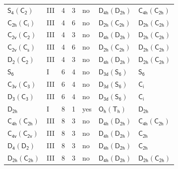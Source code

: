 \documentclass[10pt,a4paper]{article}
\numberwithin{equation}{section}
\newcommand{\grp}[1]{\mathsf{#1}}
\begin{document}
{\begin{longtable}{@{}llrrlll@{}}
\href{S4-C2.pdf}{$\grp{S_{4}}(\grp{C_{2}})$} & III & 4 & 3 & no & \href{D4h-D2h.pdf}{$\grp{D_{4h}}(\grp{D_{2h}})$} & \href{C4h-C2h.pdf}{$\grp{C_{4h}}(\grp{C_{2h}})$}\\
\href{C2h-S2.pdf}{$\grp{C_{2h}}(\grp{C_{i}})$} & III & 4 & 6 & no & \href{D2h-C2h.pdf}{$\grp{D_{2h}}(\grp{C_{2h}})$} & \href{D2h-C2h.pdf}{$\grp{D_{2h}}(\grp{C_{2h}})$}\\
\href{C2v-C2.pdf}{$\grp{C_{2v}}(\grp{C_{2}})$} & III & 4 & 3 & no & \href{D4h-D2h.pdf}{$\grp{D_{4h}}(\grp{D_{2h}})$} & \href{D2h-C2h.pdf}{$\grp{D_{2h}}(\grp{C_{2h}})$}\\
\href{C2v-C1v.pdf}{$\grp{C_{2v}}(\grp{C_{s}})$} & III & 4 & 6 & no & \href{D2h-C2h.pdf}{$\grp{D_{2h}}(\grp{C_{2h}})$} & \href{D2h-C2h.pdf}{$\grp{D_{2h}}(\grp{C_{2h}})$}\\
\href{D2-C2.pdf}{$\grp{D_{2}}(\grp{C_{2}})$} & III & 4 & 3 & no & \href{D4h-D2h.pdf}{$\grp{D_{4h}}(\grp{D_{2h}})$} & \href{D2h-C2h.pdf}{$\grp{D_{2h}}(\grp{C_{2h}})$}\\
\href{../../../rotation/data/pdf/S6.pdf}{$\grp{S_{6}}$} & I & 6 & 4 & no & \href{D3d-S6.pdf}{$\grp{D_{3d}}(\grp{S_{6}})$} & \href{../../../rotation/data/pdf/S6.pdf}{$\grp{S_{6}}$}\\
\href{C3v-C3.pdf}{$\grp{C_{3v}}(\grp{C_{3}})$} & III & 6 & 4 & no & \href{D3d-S6.pdf}{$\grp{D_{3d}}(\grp{S_{6}})$} & \href{../../../rotation/data/pdf/S2.pdf}{$\grp{C_{i}}$}\\
\href{D3-C3.pdf}{$\grp{D_{3}}(\grp{C_{3}})$} & III & 6 & 4 & no & \href{D3d-S6.pdf}{$\grp{D_{3d}}(\grp{S_{6}})$} & \href{../../../rotation/data/pdf/S2.pdf}{$\grp{C_{i}}$}\\
\href{../../../rotation/data/pdf/D2h.pdf}{$\grp{D_{2h}}$} & I & 8 & 1 & yes & \href{Oh-Th.pdf}{$\grp{O_{h}}(\grp{T_{h}})$} & \href{../../../rotation/data/pdf/D2h.pdf}{$\grp{D_{2h}}$}\\
\href{C4h-C2h.pdf}{$\grp{C_{4h}}(\grp{C_{2h}})$} & III & 8 & 3 & no & \href{D4h-D2h.pdf}{$\grp{D_{4h}}(\grp{D_{2h}})$} & \href{C4h-C2h.pdf}{$\grp{C_{4h}}(\grp{C_{2h}})$}\\
\href{C4v-C2v.pdf}{$\grp{C_{4v}}(\grp{C_{2v}})$} & III & 8 & 3 & no & \href{D4h-D2h.pdf}{$\grp{D_{4h}}(\grp{D_{2h}})$} & \href{../../../rotation/data/pdf/C2h.pdf}{$\grp{C_{2h}}$}\\
\href{D4-D2.pdf}{$\grp{D_{4}}(\grp{D_{2}})$} & III & 8 & 3 & no & \href{D4h-D2h.pdf}{$\grp{D_{4h}}(\grp{D_{2h}})$} & \href{../../../rotation/data/pdf/C2h.pdf}{$\grp{C_{2h}}$}\\
\href{D2h-C2h.pdf}{$\grp{D_{2h}}(\grp{C_{2h}})$} & III & 8 & 3 & no & \href{D4h-D2h.pdf}{$\grp{D_{4h}}(\grp{D_{2h}})$} & \href{D2h-C2h.pdf}{$\grp{D_{2h}}(\grp{C_{2h}})$}\\

\end{longtable}}
\end{document}
